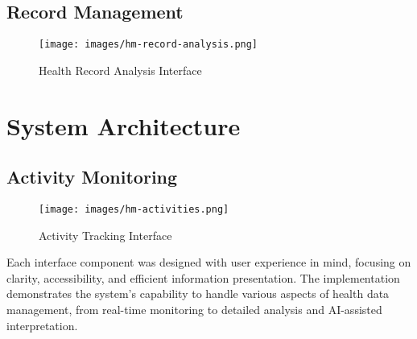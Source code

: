 \subsection{Record Management}
\begin{figure}[H]
    \centering
    \texttt{[image: images/hm-record-analysis.png]}
    \caption{Health Record Analysis Interface}
\end{figure}

\section{System Architecture}
\subsection{Activity Monitoring}
\begin{figure}[H]
    \centering
    \texttt{[image: images/hm-activities.png]}
    \caption{Activity Tracking Interface}
\end{figure}

Each interface component was designed with user experience in mind, focusing on clarity, accessibility, and efficient information presentation. The implementation demonstrates the system's capability to handle various aspects of health data management, from real-time monitoring to detailed analysis and AI-assisted interpretation.

\newpage 